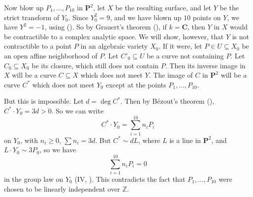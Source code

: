 {Now blow up $P_1,\dots,P_{10}$ in $\mathbf P^2$, let $X$ be the resulting surface, and let $Y$ be the strict transform of $Y_0$. Since $Y_0^2=9$, and we have blown up $10$ points on $Y$, we have $Y^2=-1$, using (). So by Grauert's theorem (), if $k=\mathbf C$, then $Y$ in $X$ would be contractible to a complex analytic space. We will show, however, that $Y$ is not contractible to a point $P$ in an algebraic variety $X_0$. If it were, let $P\in U\subseteq X_0$ be an open affine neighborhood of $P$. Let $C'_0\subseteq U$ be a curve not containing $P$. Let $C_0\subseteq X_0$ be its closure, which still does not contain $P$. Then its inverse image in $X$ will be a curve $C\subseteq X$ which does not meet $Y$. The image of $C$ in $\mathbf P^2$ will be a curve $C^*$ which does not meet $Y_0$ except at the points $P_1,\dots,P_{10}$.

But this is impossible. Let $d=\deg C^*$. Then by B\'ezout's theorem (), $C^*\cdot Y_0=3d>0$. So we can write
\[
C^*\cdot Y_0=\sum_{i=1}^{10}n_iP_i
\]
on $Y_0$, with $n_i\ge0$, $\sum n_i=3d$. But $C^*\sim dL$, where $L$ is a line in $\mathbf P^2$, and $L\cdot Y_0\sim3P_0$, so we have
\[
\sum_{i=1}^{10}n_iP_i=0
\]
in the group law on $Y_0$ (IV, ). This contradicts the fact that $P_1,\dots,P_{10}$ were chosen to be linearly independent over $\mathbb Z$.}
